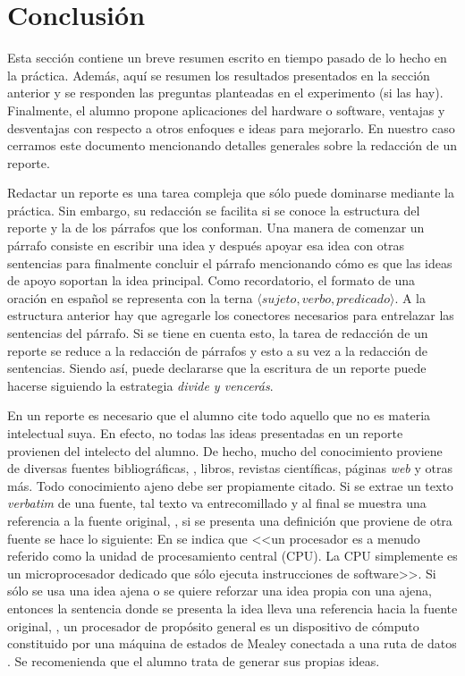 \documentclass[12pt]{article}
\begin{document}
\section{Conclusión}\label{sec:conclusion}

Esta sección contiene un breve resumen escrito en tiempo pasado de lo hecho en 
la práctica. Además, aquí se resumen los resultados presentados en la sección 
anterior y se responden las preguntas planteadas en el experimento 
(si las hay). Finalmente, el alumno propone aplicaciones del hardware o 
software, ventajas y desventajas con respecto a otros enfoques e ideas para 
mejorarlo. En nuestro caso cerramos este documento mencionando detalles 
generales sobre la redacción de un reporte.

Redactar un reporte es una tarea compleja que sólo puede dominarse mediante la 
práctica. Sin embargo, su redacción se facilita si se conoce la estructura del 
reporte y la de los párrafos que los conforman. Una manera de comenzar un 
párrafo consiste en escribir una idea y después apoyar esa idea con otras 
sentencias para finalmente concluir el párrafo mencionando cómo es que las 
ideas de apoyo soportan la idea principal. Como recordatorio, el formato de 
una oración en español se representa con la terna 
$\langle sujeto,verbo,predicado \rangle$. A la estructura anterior hay que 
agregarle los conectores necesarios para entrelazar las sentencias del párrafo. 
Si se tiene en cuenta esto, la tarea de redacción de un reporte se reduce a la 
redacción de párrafos y esto a su vez a la redacción de sentencias. Siendo así, 
puede declararse que la escritura de un reporte puede hacerse siguiendo la 
estrategia \textit{divide y vencerás}.

En un reporte es necesario que el alumno cite todo aquello que no es materia 
intelectual suya. En efecto, no todas las ideas presentadas en un reporte 
provienen del intelecto del alumno. De hecho, mucho del conocimiento proviene 
de diversas fuentes bibliográficas, \eg, libros, revistas científicas, 
páginas \textit{web} y otras más. Todo conocimiento ajeno debe ser propiamente 
citado. Si se extrae un texto \textit{verbatim} de una fuente, tal texto va 
entrecomillado y al final se muestra una referencia a la fuente original, \eg, 
si se presenta una definición que proviene de otra fuente se hace lo siguiente: 
En \cite{HwEn05} se indica que <<un procesador es a menudo referido como la 
unidad de procesamiento central (CPU). La CPU simplemente es un microprocesador 
dedicado que sólo ejecuta instrucciones de software>>. Si sólo se usa una idea 
ajena o se quiere reforzar una idea propia con una ajena, entonces la sentencia 
donde se presenta la idea lleva una referencia hacia la fuente original, \eg, 
un procesador de propósito general es un dispositivo de cómputo constituido por 
una máquina de estados de Mealey conectada a una ruta de datos 
\cite{HwEn05,MuMi07,StWi13}. Se recomenienda que el alumno trata de generar sus 
propias ideas.
\end{document}
